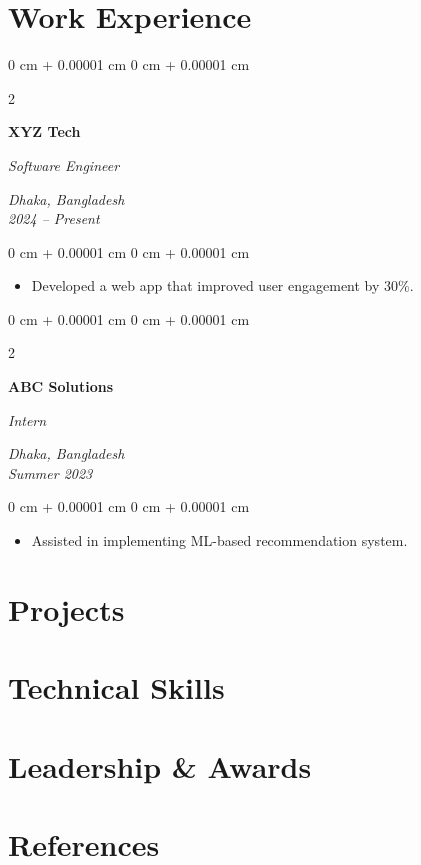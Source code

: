 \documentclass[10pt, letterpaper]{article}
\newenvironment{highlights}{
    \begin{itemize}[
        topsep=0.10 cm,
        parsep=0.10 cm,
        partopsep=0pt,
        itemsep=0pt,
        leftmargin=0 cm + 10pt
    ]
}{
    \end{itemize}
} %
\newenvironment{onecolentry}{
    \begin{adjustwidth}{
        0 cm + 0.00001 cm
    }{
        0 cm + 0.00001 cm
    }
}{
    \end{adjustwidth}
} %
\newenvironment{twocolentry}[2][]{
    \onecolentry
    \def\secondColumn{#2}
    \setcolumnwidth{\fill, 4.5 cm}
    \begin{paracol}{2}
}{
    \switchcolumn \raggedleft \secondColumn
    \end{paracol}
    \endonecolentry
} %
\begin{document}
    \section{Work Experience}
    \begin{twocolentry}{
    \textit{Dhaka, Bangladesh}\\
    \textit{2024 – Present}}
        \textbf{XYZ Tech}

        \textit{Software Engineer}
\end{twocolentry}
\begin{onecolentry}
    \begin{highlights}
        \item Developed a web app that improved user engagement by 30\%.
    \end{highlights}

    \vspace{0.1 cm}
\end{onecolentry}
\begin{twocolentry}{
    \textit{Dhaka, Bangladesh}\\
    \textit{Summer 2023}}
        \textbf{ABC Solutions}

        \textit{Intern}
\end{twocolentry}
\begin{onecolentry}
    \begin{highlights}
        \item Assisted in implementing ML-based recommendation system.
    \end{highlights}

    \vspace{0.1 cm}
\end{onecolentry}

    

    
   
    \section{Projects}
    

    \section{Technical Skills}
    

    \section{Leadership \& Awards}
    

    \section{References}
    
\end{document}
